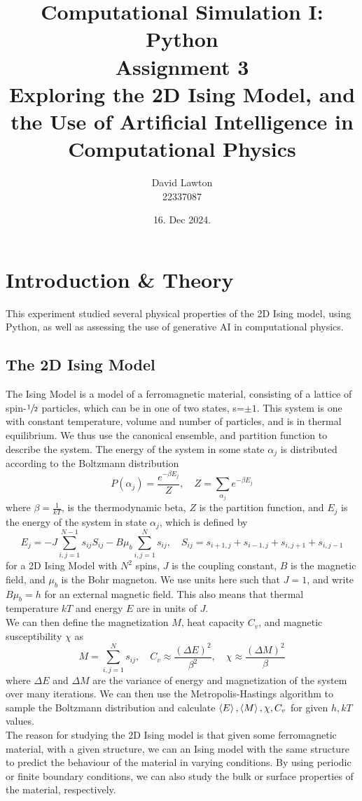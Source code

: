 \documentclass{article}
\title{Computational Simulation I: Python\\Assignment 3\\Exploring the 2D Ising Model, and the Use of Artificial Intelligence in Computational Physics}
\author{David Lawton\\22337087}
\date{16. Dec 2024.}
\theoremstyle{definition}
\theoremstyle{remark}
\begin{document}
\maketitle

\tableofcontents
\section{Introduction \& Theory}
This experiment studied several physical properties of the 2D Ising model, using Python, as well as assessing the use of generative AI in computational physics.
\subsection{The 2D Ising Model}
The Ising Model is a model of a ferromagnetic material, consisting of a lattice of spin-$\sfrac{1}{2}$ particles, which can be in one of two states, s=$\pm 1$. This system is one with constant temperature, volume and number of particles, and is in thermal equilibrium. We thus use the canonical ensemble, and partition function to describe the system. The energy of the system in some state $\alpha_j$ is distributed according to the Boltzmann distribution\cite{doi:https://doi.org/10.1002/9783527618835.ch12}
\begin{equation}
    P(\alpha_j) = \frac{e^{-\beta E_j}}{Z}, \quad Z = \sum_{\alpha_j} e^{-\beta E_j}
\end{equation}
where $\beta = \frac{1}{kT}$, is the thermodynamic beta, $Z$ is the partition function, and $E_j$ is the energy of the system in state $\alpha_j$, which is defined by
\begin{equation}
    E_j = -J\sum_{i,j=1}^{N-1} s_{ij}S_{ij} - B\mu_b\sum_{i,j=1}^{N}s_{ij}, \quad S_{ij} = s_{i+1,j} + s_{i-1,j} + s_{i,j+1} + s_{i,j-1}
\end{equation}
for a 2D Ising Model with $N^2$ spins, $J$ is the coupling constant, $B$ is the magnetic field, and $\mu_b$ is the Bohr magneton. We use units here such that $J = 1$, and write $B\mu_b = h$ for an external magnetic field. This also means that thermal temperature $kT$ and energy $E$ are in units of $J$.\\
We can then define the magnetization $M$, heat capacity $C_v$, and magnetic susceptibility $\chi$ as
\begin{equation}
    M = \sum_{i,j=1}^{N}s_{ij}, \quad C_v \approx\frac{(\Delta E)^2}{\beta^2}, \quad \chi\approx\frac{(\Delta M)^2}{\beta}
\end{equation}
where $\Delta E$ and $\Delta M$ are the variance of energy and magnetization of the system over many iterations. We can then use the Metropolis-Hastings algorithm to sample the Boltzmann distribution and calculate $\braket{E},\braket{M},\chi,C_v$ for given $h, kT$ values.\\
\indent The reason for studying the 2D Ising model is that given some ferromagnetic material, with a given structure, we can an Ising model with the same structure to predict the behaviour of the material in varying conditions. By using periodic or finite boundary conditions, we can also study the bulk or surface properties of the material, respectively.\\
\end{document}
